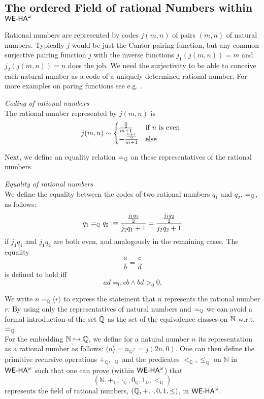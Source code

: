 \subsection{The ordered Field of rational Numbers within ${\textsf{\upshape WE-HA}}^{\omega}$}
%
Rational numbers are represented by
codes $j(m,n)$ of pairs $(m,n)$ of natural numbers. 
Typically $j$ would be just the Cantor pairing function, but any common surjective pairing 
function $j$ with the inverse functions $j_1(j(m,n))=m$ and $j_2(j(m,n))=n$ does the job.
We need the surjectivity to be able to conceive each natural number as a code of
a uniquely determined rational number.
For more examples on paring functions see e.g. \cite{Odifreddi89}.
\begin{dfn}{\em Coding of rational numbers\\}
The rational number represented by $j(m,n)$ is 
\[
    j(m,n)\sim\begin{cases}
         \frac{\frac{n}{2}}{m+1} &\text{if $n$ is even}\\
        - \frac{\frac{n+1}{2}}{m+1} &\text{else} \end{cases}\text{.}
\]
\end{dfn}
Next, we define an equality relation $=_{\mathbb{Q}}$ on 
these representatives of the rational numbers.
\begin{dfn}{\em Equality of rational numbers\\}
We define the equality between the codes of two rational numbers
 $q_1$ and $q_2$, $=_{\mathbb{Q}}$, as follows:
\[
    q_{1} =_{\mathbb{Q}} q_{2} : \equiv
    \frac{\frac{j_{1}q_{1}}{2}}{j_{2}q_{1}+1} =
    \frac{\text{$\frac{j_1q_2}{2}$}}{j_{2}q_{2}+1}  
\]
if $j_{1}q_{1}$ and $j_{1}q_{2}$ are both even, and analogously
in the remaining cases. 
The equality
\[\frac{a}{b} = \frac{c}{d}\]
is defined to hold iff
   \[ad =_{0} cb \wedge bd >_0 0\text{.}\]
\end{dfn}                       
%
We write $n=_{\mathbb{Q}} \langle r \rangle$ to
express the statement that $n$ represents the rational number
$r$. By using only the representatives of natural 
numbers and $=_{\mathbb{Q}}$
we can avoid a formal introduction of the set $\mathbb{Q}$ as 
the set of the equivalence classes on $\mathbb{N}$ w.r.t. $=_{\mathbb{Q}}$.\\
For the embedding $\mathbb{N}\hookrightarrow\mathbb{Q}$, we define for a natural number $n$ its representation
as a rational number as follows: 
$\langle n\rangle = n_{\mathbb{Q}} : = j(2n,0)$. 
One can then define the primitive recursive operations $+_{\mathbb{Q}}, 
\cdot_{\mathbb{Q}}$ and 
the predicates $<_{\mathbb{Q}}, \leq_{\mathbb{Q}}$ on $\mathbb{N}$ in
${\textsf{\upshape WE-HA}}^{\omega}$ such that one can prove (within ${\textsf{\upshape WE-HA}}^{\omega}$)
that \[(\mathbb{N}, +_{\mathbb{Q}}, \cdot_{\mathbb{Q}}, 0_{\mathbb{Q}},
1_{\mathbb{Q}}, <_{\mathbb{Q}})\] 
represents the field of rational numbers, $(\mathbb{Q},+,\cdot,0,1,\leq)$, in ${\textsf{\upshape WE-HA}}^{\omega}$.
%
%
